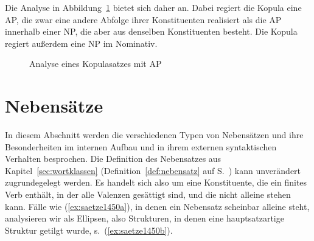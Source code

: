 \begin{exe}
\end{exe}

Die Analyse in Abbildung~\ref{fig:kopulav22} bietet sich daher an.
Dabei regiert die Kopula eine AP, die zwar eine andere Abfolge ihrer Konstituenten realisiert als die AP innerhalb einer NP, die aber aus denselben Konstituenten besteht.
Die Kopula regiert außerdem eine NP im Nominativ.

\begin{figure}[!htbp]
  \caption{Analyse eines Kopulasatzes mit AP}
  \label{fig:kopulav22}
\end{figure}



\Unstretch[1]

\section{Nebensätze}

\label{sec:nebensaetze}

In diesem Abschnitt werden die verschiedenen Typen von Nebensätzen und ihre Besonderheiten im internen Aufbau und in ihrem externen syntaktischen Verhalten besprochen.
Die Definition des Nebensatzes aus Kapitel~\ref{sec:wortklassen} (Definition~\ref{def:nebensatz} auf S.~\pageref{def:nebensatz}) kann unverändert zugrundegelegt werden.
Es handelt sich also um eine Konstituente, die ein finites Verb enthält, in der alle Valenzen gesättigt sind, und die nicht alleine stehen kann.
Fälle wie (\ref{ex:saetze1450a}), in denen ein Nebensatz scheinbar alleine steht, analysieren wir als Ellipsen, also Strukturen, in denen eine hauptsatzartige Struktur getilgt wurde, s.\ (\ref{ex:saetze1450b}).

